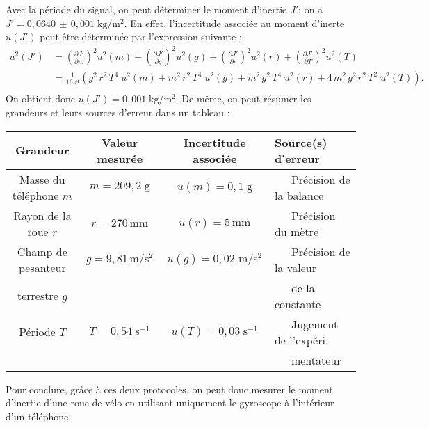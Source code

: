 \documentclass[a4paper]{report}
\newcommand{\tabitem}{~\llap{--}~~}
\newcommand{\tabnoitem}{~~~}
\begin{document}
	Avec la période du signal, on peut déterminer le moment d'inertie $J'$: on a $J' = 0,\!0640\,\pm\, 0,\!001\;\text{kg}/\text{m}^2$. En effet, l'incertitude associée au moment d'inerte $u(J')$ peut être déterminée par l'expression suivante :
	\begin{align*}
		u^2(J') &= \left( \frac{\partial J'}{\partial m} \right)^2 u^2(m) + \left( \frac{\partial J'}{\partial g} \right)^2 u^2(g) + \left( \frac{\partial J'}{\partial r} \right)^2 u^2(r) + \left( \frac{\partial J'}{\partial T} \right)^2 u^2(T)\\
		&= \frac{1}{16 \pi^4} \left(g^2\,r^2\,T^4\; u^2(m) + m^2\,r^2\,T^4\; u^2(g) + m^2\,g^2\,T^4\; u^2(r) + 4\,m^2\,g^2\,r^2\,T^2\; u^2(T) \right).\\
	\end{align*}
	On obtient donc $u(J') = 0,\!001\;\text{kg}/\text{m}^2$. De même, on peut résumer les grandeurs et leurs sources d'erreur dans un tableau :

	\begin{adjustbox}{center}
		\begin{tabular}{|c|c|c|l|}\hline
			\sc Grandeur&\sc Valeur mesurée&\sc Incertitude associée&\sc Source(s) d'erreur\\ \hline
			Masse du téléphone $m$&$m = 209,\!2\;\text{g}$&$u(m)= 0,\!1\;\text{g}$&\tabitem Précision de la balance\\ \hline
			Rayon de la roue $r$&$r = 270\,\text{mm}$&$u(r)= 5\,\text{mm}$&\tabitem Précision du mètre\\ \hline
			Champ de pesanteur&$g = 9,\!81\,\text{m}/\text{s}^2$&$u(g)= 0,\!02\,\,\text{m}/\text{s}^2$&\tabitem Précision de la valeur\\[-2mm]
			terrestre $g$&&&\tabnoitem de la constante\\ \hline
			Période $T$&$T = 0,\!54\;\text{s}^{-1}$&$u(T) = 0,\!03\;\text{s}^{-1}$&\tabitem Jugement de l'expéri-\\[-2mm]
		&&&\tabnoitem mentateur\\\hline
		\end{tabular}
	\end{adjustbox}

	Pour conclure, grâce à ces deux protocoles, on peut donc mesurer le moment d'inertie d'une roue de vélo en utilisant uniquement le gyroscope à l'intérieur d'un téléphone.
\end{document}
